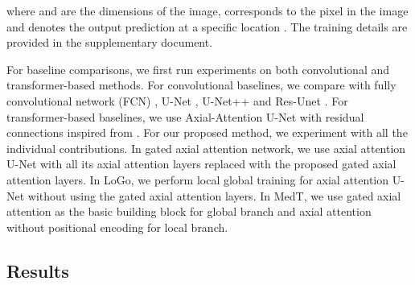 \documentclass[runningheads]{llncs}
\begin{document}
	where  and  are the dimensions of the image,   corresponds to the pixel in the image and   denotes the output prediction at a specific location . The training details are provided in the supplementary document.


	For baseline comparisons, we first run experiments on both convolutional and transformer-based methods. For convolutional baselines, we compare with fully convolutional network (FCN) \cite{badrinarayanan2017segnet}, U-Net \cite{ronneberger2015u}, U-Net++ \cite{zhou2018unet++} and Res-Unet \cite{xiao2018weighted}. For transformer-based baselines, we use Axial-Attention U-Net with residual connections inspired from \cite{wang2020axial}. For our proposed method, we experiment with all the individual contributions. In gated axial attention network, we use axial attention U-Net with all its axial attention layers replaced with the proposed gated axial attention layers. In LoGo, we perform local global training for axial attention U-Net without using the gated axial attention layers. In MedT, we use gated axial attention as the basic building block for global branch and axial attention without positional encoding for local branch.
	
	\subsection{Results}
	
\end{document}
